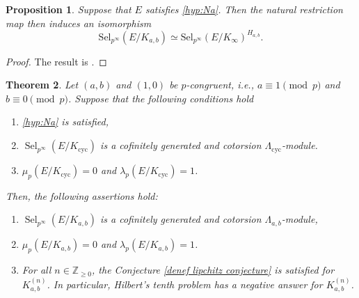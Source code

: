 \documentclass[12pt]{amsart}
\newtheorem{theorem}{Theorem}[section]
\newtheorem{proposition}[theorem]{Proposition}
\newcommand{\Z}{\mathbb{Z}}
\newcommand{\Sel}{\mathrm{Sel}}
\newcommand{\op}[1]{\operatorname{#1}}
\numberwithin{equation}{section}
\begin{document}
\begin{proposition}
\label{prop:control-ord}
Suppose that $E$ satisfies \eqref{hyp:Na}. Then the natural restriction map then induces an isomorphism
\[
\Sel_{p^\infty}(E/K_{a,b})\simeq \Sel_{p^\infty}(E/K_\infty)^{H_{a,b}}.
\]
\end{proposition}

\begin{proof}
    The result is \cite[Proposition 3.2]{gajek2024conjecture}.
\end{proof}

\begin{theorem}\label{main thm 1}
Let $(a,b)$ and $(1, 0)$ be $p$-congruent, i.e., $a\equiv 1\pmod{p}$ and $b\equiv 0\pmod{p}$. Suppose that the following conditions hold
    \begin{enumerate}
         \item \eqref{hyp:Na} is satisfied, 
        \item $\op{Sel}_{p^\infty}(E/K_{\op{cyc}})$ is a cofinitely generated and cotorsion $\Lambda_{\op{cyc}}$-module.
        \item $\mu_p(E/K_{\op{cyc}})=0$ and $\lambda_p(E/K_{\op{cyc}})=1$.
    \end{enumerate} 
    Then, the following assertions hold:
    \begin{enumerate}
        \item $\op{Sel}_{p^\infty}(E/K_{a,b})$ is a cofinitely generated and cotorsion $\Lambda_{a,b}$-module,
        \item $\mu_p(E/K_{a,b})=0$ and $\lambda_p(E/K_{a,b})=1$.
        \item For all $n\in \Z_{\geq 0}$, the Conjecture \ref{denef lipchitz conjecture} is satisfied for $K_{a,b}^{(n)}$. In particular, Hilbert's tenth problem has a negative answer for $K_{a,b}^{(n)}$.
    \end{enumerate} 
\end{theorem}
\end{document}
